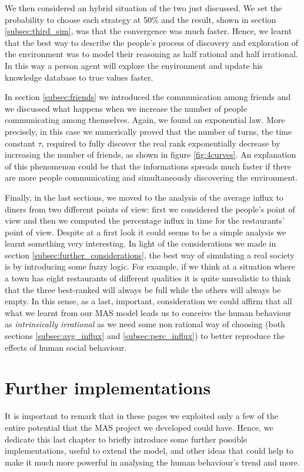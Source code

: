 \documentclass[10pt,a4paper,usenatbib]{article}
\begin{document}
We then considered an hybrid situation of the two just discussed. We set the probability to choose each strategy at 50\% and the result, shown in section \ref{subsec:third_sim}, was that the convergence was much faster. Hence, we learnt that the best way to describe the people's process of discovery and exploration of the environment was to model their reasoning as half rational and half irrational. In this way a person agent will explore the environment and update his knowledge database to true values faster.

In section \ref{subsec:friends} we introduced the communication among friends and we discussed what happens when we increase the number of people communicating among themselves. Again, we found an exponential law. More precisely, in this case we numerically proved that the number of turns, the time constant $\tau$, required to fully discover the real rank exponentially decrease by increasing the number of friends, as shown in figure \ref{fig:4curves}. An explanation of this phenomenon could be that the informations spreads much faster if there are more people communicating and simultaneously discovering the environment.

Finally, in the last sections, we moved to the analysis of the average influx to diners from two different points of view: first we considered the people's point of view and then we computed the percentage influx in time for the restaurants' point of view. Despite at a first look it could seems to be a simple analysis we learnt something very interesting. In light of the considerations we made in section \ref{subsec:further_considerations}, the best way of simulating a real society is by introducing some fuzzy logic. For example, if we think at a situation where a town has eight restaurants of different qualities it is quite unrealistic to think that the three best-ranked will always be full while the others will always be empty. In this sense, as a last, important, consideration we could affirm that all what we learnt from our MAS model leads us to conceive the human behaviour as \textit{intrinsically irrational} as we need some non rational way of choosing (both sections \ref{subsec:avg_influx} and \ref{subsec:perc_influx}) to better reproduce the effects of human social behaviour.

\section{Further implementations}
It is important to remark that in these pages we exploited only a few of the entire potential that the MAS project we developed could have. Hence, we dedicate this last chapter to briefly introduce some further possible implementations, useful to extend the model, and other ideas that could help to make it much more powerful in analysing the human behaviour’s trend and more.
\end{document}
